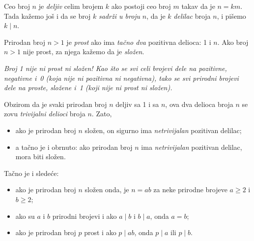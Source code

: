 \begin{DEF}
  Ceo broj $n$ je \emph{deljiv} celim brojem $k$ ako postoji ceo broj $m$ takav da je $n = km$.
  Tada ka\v zemo jo\v s i da se broj $k$ \emph{sadr\v zi u broju} $n$, da je $k$ \emph{delilac} broja $n$,
  i pi\v semo $k \mid n$.

  Prirodan broj $n > 1$ je \emph{prost} ako ima \emph{ta\v cno dva} pozitivna delioca: 1 i $n$.
  Ako broj $n > 1$ nije prost, za njega ka\v zemo da je \emph{slo\v zen}.
\end{DEF}

\begin{NAP}
  \textit{Broj 1 nije ni prost ni slo\v zen! Kao \v sto se svi celi brojevi dele na pozitivne,
  negativne i~0 (koja nije ni pozitivna ni negativna), tako se svi prirodni brojevi dele na
  proste, slo\v zene i~1 (koji nije ni prost ni slo\v zen).}
\end{NAP}

\noindent
Obzirom da je svaki prirodan broj $n$ deljiv sa 1 i sa $n$, ova dva delioca broja $n$
se zovu \emph{trivijalni delioci} broja $n$. Zato,
\begin{itemize}
  \item ako je prirodan broj $n$ slo\v zen, on sigurno ima \emph{netrivijalan} pozitivan delilac;
  \item a ta\v cno je i obrnuto: ako prirodan broj $n$ ima \emph{netrivijalan} pozitivan delilac, mora biti slo\v zen.
\end{itemize}

\noindent
Ta\v cno je i slede\'ce:
\begin{itemize}
\item ako je prirodan broj $n$ slo\v zen onda, je $n = ab$ za neke prirodne brojeve $a \ge 2$ i $b \ge 2$;
\item ako su $a$ i $b$ prirodni brojevi i ako $a \mid b$ i $b \mid a$, onda $a = b$;
\item ako je prirodan broj $p$ prost i ako $p \mid ab$, onda $p \mid a$ ili $p \mid b$.
\end{itemize}





